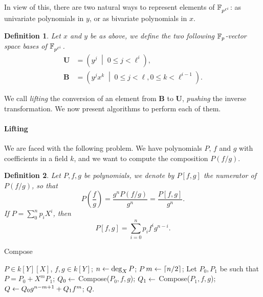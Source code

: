 \documentclass{sig-alternate}
\newtheorem{definition}{Definition}
\newcommand{\bb}{\mathbf{B}}
\newcommand{\uu}{\mathbf{U}}  %
\begin{document}
In view of this, there are two natural ways to represent elements of
$\mathbb{F}_{p^{\ell^i}}$: as univariate polynomials in $y$, or as bivariate
polynomials in $x$.

\begin{definition}
  Let $x$ and $y$ be as above, we define the two following
  $\mathbb{F}_p$-vector space bases of $\mathbb{F}_{p^{\ell^i}}$.
  \begin{align}
    \label{eq:uni-basis}
    \uu &= \left(y^j \;\middle|\; 0\le j <\ell^i\right),\\
    \label{eq:bi-basis}
    \bb &= \left(y^jx^k \;\middle|\; 0\le j <\ell, 0\le k <\ell^{i-1}\right).
  \end{align}
\end{definition}

We call \emph{lifting} the conversion of an element from $\bb$ to
$\uu$, \emph{pushing} the inverse transformation. We now present
algorithms to perform each of them.

\paragraph{Lifting}
We are faced with the following problem. We have polynomials $P$, $f$
and $g$ with coefficients in a field $k$, and we want to compute the
composition $P(f/g)$.

\begin{definition}
  Let $P,f,g$ be polynomials, we denote by $P[f,g]$ the numerator of
  $P(f/g)$, so that
  \begin{equation}
    P\left(\frac{f}{g}\right) = \frac{g^nP(f/g)}{g^n} = \frac{P[f,g]}{g^n}.
  \end{equation}
  If $P=\sum_0^np_iX^i$, then
  \begin{equation}
    P[f,g] = \sum_{i=0}^n  p_if^ig^{n-i}.
  \end{equation}
\end{definition}

\begin{algorithm}[t]
  \caption{Compose}
  \label{alg:compose}
  \begin{algorithmic}[1]
    \REQUIRE $P\in k[Y][X]$, $f,g\in k[Y]$;
    \STATE $n \leftarrow \deg_X P$;
    \ENSURE $P$
    \ELSE
    \STATE $m \leftarrow \lceil n/2\rceil$;
    \STATE Let $P_0,P_1$ be such that $P = P_0 + X^mP_1$;
    \STATE $Q_0 \leftarrow$ Compose($P_0, f, g$);
    \STATE $Q_1 \leftarrow$ Compose($P_1, f, g$);
    \STATE \label{alg:compose:res}
    $Q \leftarrow Q_0g^{n-m+1} + Q_1f^m$;
    \ENSURE $Q$.
    \ENDIF
  \end{algorithmic}
\end{algorithm}
\end{document}
